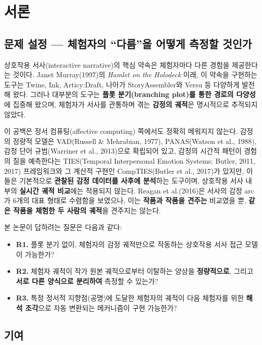 \documentclass[11pt, a4paper]{article}
\begin{document}
\section{서론}

\subsection{문제 설정 --- 체험자의 ``다름''을 어떻게 측정할 것인가}

상호작용 서사(interactive narrative)의 핵심 약속은 체험자마다 다른 경험을 제공한다는 것이다. Janet Murray(1997)의 \textit{Hamlet on the Holodeck} 이래, 이 약속을 구현하는 도구는 Twine, Ink, Articy:Draft, 나아가 StoryAssembler와 Versu 등 다양하게 발전해 왔다. 그러나 대부분의 도구는 \textbf{플롯 분기(branching plot)를 통한 경로의 다양성}에 집중해 왔으며, 체험자가 서사를 관통하며 겪는 \textbf{감정의 궤적}은 명시적으로 추적되지 않았다.

이 공백은 정서 컴퓨팅(affective computing) 쪽에서도 정확히 메워지지 않는다. 감정의 정량적 모델은 VAD(Russell \& Mehrabian, 1977), PANAS(Watson et al., 1988), 감정 단어 규범(Warriner et al., 2013)으로 확립되어 있고, 감정의 시간적 패턴이 경험의 질을 예측한다는 TIES(Temporal Interpersonal Emotion Systems; Butler, 2011, 2017) 프레임워크와 그 계산적 구현인 CompTIES(Butler et al., 2017)가 있지만, 이들은 기본적으로 \textbf{관찰된 감정 데이터를 사후에 분석}하는 도구이며, 상호작용 서사 내부의 \textbf{실시간 궤적 비교}에는 적용되지 않는다. Reagan et al.(2016)은 서사의 감정 arc가 6개의 대표 형태로 수렴함을 보였으나, 이는 \textbf{작품과 작품을 견주는} 비교였을 뿐, \textbf{같은 작품을 체험한 두 사람의 궤적}을 견주지는 않는다.

본 논문이 답하려는 질문은 다음과 같다:
\begin{itemize}
  \item \textbf{R1.} 플롯 분기 없이, 체험자의 감정 궤적만으로 작동하는 상호작용 서사 접근 모델이 가능한가?
  \item \textbf{R2.} 체험자 궤적이 작가 원본 궤적으로부터 이탈하는 양상을 \textbf{정량적으로}, 그리고 \textbf{서로 다른 양식으로 분리하여} 측정할 수 있는가?
  \item \textbf{R3.} 특정 정서적 지향점(공명)에 도달한 체험자의 궤적이 다음 체험자를 위한 \textbf{해석 조각}으로 자동 변환되는 메커니즘이 구현 가능한가?
\end{itemize}

\subsection{기여}
\end{document}
